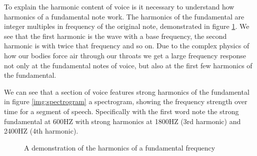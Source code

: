 \documentclass[ %
                    author={Sam Phippen},
                supervisor={Dr. Rafal Bogacz},
                     title={Real time voice activity detectors in noisy personal computing environments},
                  subtitle={},
                    degree={MEng},
                      year={2012} ]{thesis}
\begin{document}
To explain the harmonic content of voice is it necessary to understand how
harmonics of a fundamental note work. The harmonics of the fundamental are
integer multiples in frequency of the original note, demonstrated in figure
\ref{img:harmonics}. We see that the first harmonic is the wave with a base
frequency, the second harmonic is with twice that frequency and so on. Due to
the complex physics of how our bodies force air through our throats we get a
large frequency response not only at the fundamental notes of voice, but also
at the first few harmonics of the fundamental.

We can see that a section of voice features strong harmonics of the fundamental
in figure \ref{img:spectrogram} a spectrogram, showing the frequency strength
over time for a segment of speech. Specifically with the first word note the
strong fundamental at 600HZ with strong harmonics at 1800HZ (3rd harmonic) and
2400HZ (4th harmonic).

\begin{figure}
    \caption{A demonstration of the harmonics of a fundamental frequency}
    \label{img:harmonics}
\end{figure}
\end{document}
